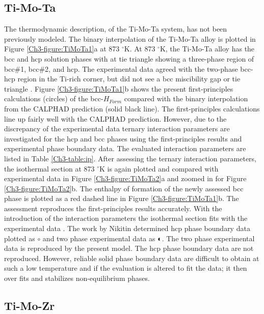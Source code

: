 \subsection{Ti-Mo-Ta}

The thermodynamic description, of the Ti-Mo-Ta system, has not been previously modeled. The binary interpolation of the Ti-Mo-Ta alloy is plotted in Figure \ref{Ch3-figure:TiMoTa1}a at 873 $^{\circ}$K. At 873 $^{\circ}$K, the Ti-Mo-Ta alloy has the bcc and hcp solution phases with at tie triangle showing a three-phase region of bcc\#1, bcc\#2, and hcp. The experimental data agreed with the two-phase bcc-hcp region in the Ti-rich corner, but did not see a bcc miscibility gap or tie triangle \cite{Nikitin1971}. Figure \ref{Ch3-figure:TiMoTa1}b shows the present first-principles calculations (circles) of the bcc-$H_{Form}$ compared with the binary interpolation from the CALPHAD prediction (solid black line). The first-principles calculations line up fairly well with the CALPHAD prediction. However, due to the discrepancy of the experimental data ternary interaction parameters are investigated for the hcp and bcc phases using the first-principles results and experimental phase boundary data. The evaluated interaction parameters are listed in Table \ref{Ch3-table:ip}. After assessing the ternary interaction parameters, the isothermal section at 873 $^{\circ}$K is again plotted and compared with experimental data in Figure \ref{Ch3-figure:TiMoTa2}a and zoomed in for Figure \ref{Ch3-figure:TiMoTa2}b. The enthalpy of formation of the newly assessed bcc phase is plotted as a red dashed line in Figure \ref{Ch3-figure:TiMoTa1}b. The assessment reproduces the first-principles results accurately. With the introduction of the interaction parameters the isothermal section fits with the experimental data \cite{Nikitin1971}. The work by Nikitin \cite{Nikitin1971} determined hcp phase boundary data plotted as $\circ$ and two phase experimental data as $\LEFTcircle$. The two phase experimental data is reproduced by the present model. The hcp phase boundary data are not reproduced. However, reliable solid phase boundary data are difficult to obtain at such a low temperature and if the evaluation is altered to fit the data; it then over fits and stabilizes non-equilibrium phases. 

\subsection{Ti-Mo-Zr}

